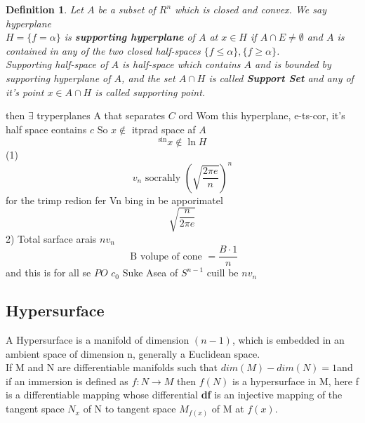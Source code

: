 \documentclass[oneside]{book}
\newtheorem{mydef}{Definition}
\begin{document}
\begin{mydef} \label{d:3}
Let $A$ be a subset of $R^{n}$ which is closed and convex. We say hyperplane \\ $H=\{f=\alpha\}$ is \textbf{supporting hyperplane} of $A$ at  $x \in H$  if $A \cap E \neq \emptyset$ and $A$ is contained in any of the two closed half-spaces $\{f \leq \alpha\}, \{f \geq \alpha\}$.
\\
    Supporting half-space of $A$ is half-space which contains $A$ and is bounded by supporting hyperplane of $A$, and the set $A \cap H$ is called \textbf{Support Set} and any of it's point $x \in A \cap H$ is called supporting point.
\end{mydef}



then $\exists$ tryperplanes A that separates $C$ ord
Wom this hyperplane, e-ts-cor, it's half space eontains $c$
So $x \notin$ itprad space af $A$
\[
^{\sin } x \notin \ln H
\]
(1)
\[
v_{n} \text { socrahly }(\sqrt{\frac{2 \pi e}{n}})^{n}
\]
for the trimp redion fer Vn bing in be apporimatel
\[
\sqrt{\frac{n}{2 \pi e}}
\]
2) Total sarface arais $n v_{n}$
\[
\text { B volupe of cone }=\frac{B \cdot 1}{n}
\]
and this is for all
se
$P O$
$c_{0}$
Suke Asea of $S^{n-1}$ cuill be $n v_{n}$



































\subsection{Hypersurface}

\label{ss:10}


A Hypersurface is a manifold of dimension $(n-1)$, which is embedded in an ambient space of dimension n, generally a Euclidean space.
\\If M and N are differentiable manifolds such that $dim(M)-dim(N) = 1 $and if an immersion is defined as $f: N\rightarrow M$ then $f(N)$ is a hypersurface in M, here f is a differentiable mapping whose differential \textbf{df} is an injective mapping of the 
     tangent space $N_{x}$ of N to  tangent space $M_{f(x)}$ of M at $f(x)$.
    
\end{document}
